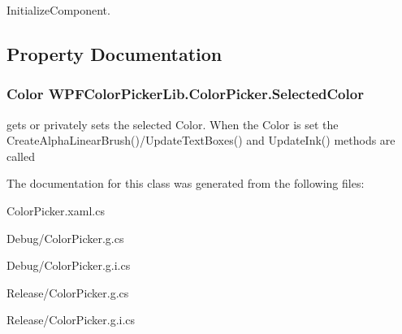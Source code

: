 InitializeComponent. 



\subsection{Property Documentation}
\hypertarget{class_w_p_f_color_picker_lib_1_1_color_picker_a0507e30a334f6bdff5b4b7533a4d1689}{
\subsubsection[{SelectedColor}]{\setlength{\rightskip}{0pt plus 5cm}Color WPFColorPickerLib.ColorPicker.SelectedColor}}
\label{class_w_p_f_color_picker_lib_1_1_color_picker_a0507e30a334f6bdff5b4b7533a4d1689}


gets or privately sets the selected Color. When the Color is set the CreateAlphaLinearBrush()/UpdateTextBoxes() and UpdateInk() methods are called 



The documentation for this class was generated from the following files:\begin{DoxyCompactItemize}
\item 
ColorPicker.xaml.cs\item 
Debug/ColorPicker.g.cs\item 
Debug/ColorPicker.g.i.cs\item 
Release/ColorPicker.g.cs\item 
Release/ColorPicker.g.i.cs\end{DoxyCompactItemize}
